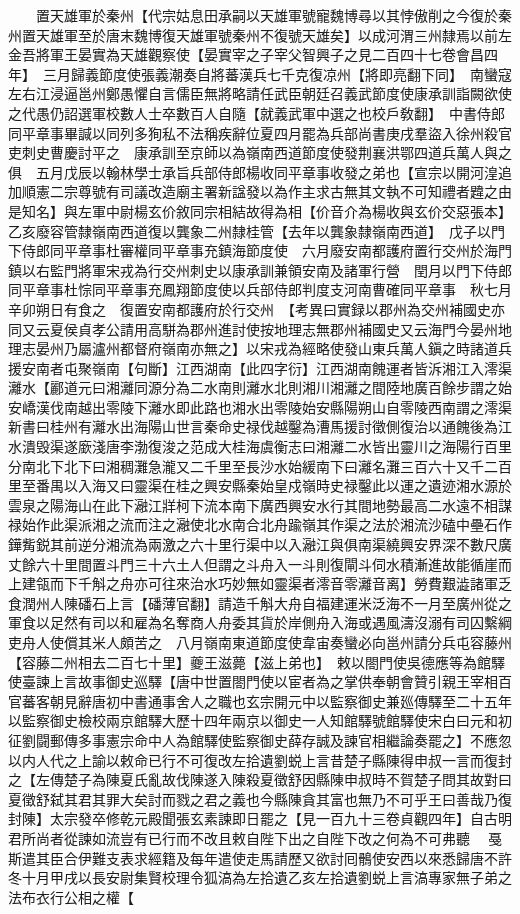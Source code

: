 　　置天雄軍於秦州【代宗姑息田承嗣以天雄軍號寵魏博尋以其悖傲削之今復於秦州置天雄軍至於唐末魏博復天雄軍號秦州不復號天雄矣】以成河渭三州隸焉以前左金吾將軍王晏實為天雄觀察使【晏實宰之子宰父智興子之見二百四十七卷會昌四年】　三月歸義節度使張義潮奏自將蕃漢兵七千克復凉州【將即亮翻下同】　南蠻寇左右江浸逼邕州鄭愚懼自言儒臣無將略請任武臣朝廷召義武節度使康承訓詣闕欲使之代愚仍詔選軍校數人士卒數百人自隨【就義武軍中選之也校戶敎翻】　中書侍郎同平章事畢諴以同列多狥私不法稱疾辭位夏四月罷為兵部尚書庚戌羣盜入徐州殺官吏刺史曹慶討平之　康承訓至京師以為嶺南西道節度使發荆襄洪鄂四道兵萬人與之俱　五月戊辰以翰林學士承旨兵部侍郎楊收同平章事收發之弟也【宣宗以開河湟追加順憲二宗尊號有司議改造廟主署新諡發以為作主求古無其文執不可知禮者韙之由是知名】與左軍中尉楊玄价敘同宗相結故得為相【价音介為楊收與玄价交惡張本】　乙亥廢容管隸嶺南西道復以龔象二州隸桂管【去年以龔象隸嶺南西道】　戊子以門下侍郎同平章事杜審權同平章事充鎮海節度使　六月廢安南都護府置行交州於海門鎮以右監門將軍宋戎為行交州刺史以康承訓兼領安南及諸軍行營　閏月以門下侍郎同平章事杜悰同平章事充鳳翔節度使以兵部侍郎判度支河南曹確同平章事　秋七月辛卯朔日有食之　復置安南都護府於行交州　【考異曰實録以郡州為交州補國史亦同又云夏侯貞孝公請用高駢為郡州進討使按地理志無郡州補國史又云海門今晏州地理志晏州乃屬瀘州都督府嶺南亦無之】以宋戎為經略使發山東兵萬人鎭之時諸道兵援安南者屯聚嶺南【句斷】江西湖南【此四字衍】江西湖南餽運者皆泝湘江入澪渠灕水【酈道元曰湘灕同源分為二水南則灕水北則湘川湘灕之間陸地廣百餘步謂之始安嶠漢伐南越出零陵下灕水即此路也湘水出零陵始安縣陽朔山自零陵西南謂之澪渠新書曰桂州有灕水出海陽山世言秦命史禄伐越鑿為漕馬援討徵側復治以通餽後為江水潰毁渠遂廞淺唐李渤復浚之范成大桂海虞衡志曰湘灕二水皆出靈川之海陽行百里分南北下北下曰湘稠灘急瀧又二千里至長沙水始緩南下曰灕名灘三百六十又千二百里至番禺以入海又曰靈渠在桂之興安縣秦始皇戍嶺時史禄鑿此以運之遺迹湘水源於雲泉之陽海山在此下瀜江牂柯下流本南下廣西興安水行其間地勢最高二水遠不相謀禄始作此渠派湘之流而注之瀜使北水南合北舟踰嶺其作渠之法於湘流沙磕中壘石作鏵觜鋭其前逆分湘流為兩激之六十里行渠中以入瀜江與俱南渠繞興安界深不數尺廣丈餘六十里間置斗門三十六土人但謂之斗舟入一斗則復閘斗伺水積漸進故能循崖而上建瓴而下千斛之舟亦可往來治水巧妙無如靈渠者澪音零灕音离】勞費艱澁諸軍乏食潤州人陳磻石上言【磻薄官翻】請造千斛大舟自福建運米泛海不一月至廣州從之軍食以足然有司以和雇為名奪商人舟委其貨於岸側舟入海或遇風濤沒溺有司囚繫綱吏舟人使償其米人頗苦之　八月嶺南東道節度使韋宙奏蠻必向邕州請分兵屯容藤州【容藤二州相去二百七十里】夔王滋薨【滋上弟也】　敕以閤門使吳德應等為館驛使臺諫上言故事御史巡驛【唐中世置閤門使以宦者為之掌供奉朝會贊引親王宰相百官蕃客朝見辭唐初中書通事舍人之職也玄宗開元中以監察御史兼廵傳驛至二十五年以監察御史檢校兩京館驛大歷十四年兩京以御史一人知館驛號館驛使宋白曰元和初征劉闘郵傳多事憲宗命中人為館驛使監察御史薛存誠及諫官相繼論奏罷之】不應忽以内人代之上諭以敕命已行不可復改左拾遺劉蜕上言昔楚子縣陳得申叔一言而復封之【左傳楚子為陳夏氏亂故伐陳遂入陳殺夏徵舒因縣陳申叔時不賀楚子問其故對曰夏徵舒弑其君其罪大矣討而戮之君之義也今縣陳貪其富也無乃不可乎王曰善哉乃復封陳】太宗發卒修乾元殿聞張玄素諫即日罷之【見一百九十三卷貞觀四年】自古明君所尚者從諫如流豈有已行而不改且敕自陛下出之自陛下改之何為不可弗聽　戞斯遣其臣合伊難支表求經籍及每年遣使走馬請歷又欲討囘鶻使安西以來悉歸唐不許　冬十月甲戌以長安尉集賢校理令狐滈為左拾遺乙亥左拾遺劉蜕上言滈專家無子弟之法布衣行公相之權【